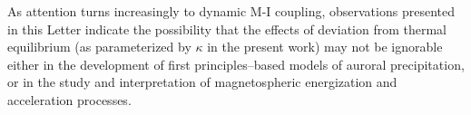   As attention turns increasingly to dynamic M-I coupling, observations
  presented in this Letter indicate the possibility that the effects of
  deviation from thermal equilibrium (as parameterized by $\kappa$ in the
  present work) may not be ignorable either in the development of first
  principles--based models of auroral precipitation, or in the study and
  interpretation of magnetospheric energization and acceleration processes.


  



